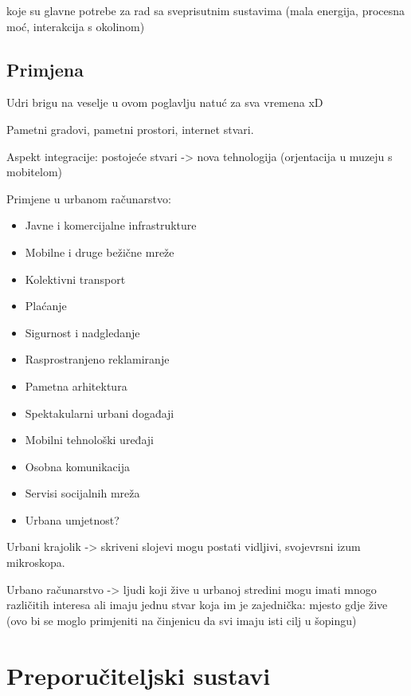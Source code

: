 \documentclass[times, utf8, diplomski, numeric]{fer}
\begin{document}
koje su glavne potrebe za rad sa sveprisutnim sustavima (mala energija,
procesna moć, interakcija s okolinom)

\section{Primjena}

Udri brigu na veselje u ovom poglavlju natuć za sva vremena xD

Pametni gradovi, pametni prostori, internet stvari.

Aspekt integracije: postojeće stvari -> nova tehnologija (orjentacija u muzeju
s mobitelom)

Primjene u urbanom računarstvo:
\begin{itemize}
  \item Javne i komercijalne infrastrukture
  \item Mobilne i druge bežične mreže
  \item Kolektivni transport
  \item Plaćanje
  \item Sigurnost i nadgledanje
  \item Rasprostranjeno reklamiranje
  \item Pametna arhitektura
  \item Spektakularni urbani događaji
  \item Mobilni tehnološki uređaji
  \item Osobna komunikacija
  \item Servisi socijalnih mreža
  \item Urbana umjetnost?
\end{itemize}

Urbani krajolik -> skriveni slojevi mogu postati vidljivi, svojevrsni izum
mikroskopa.

Urbano računarstvo -> ljudi koji žive u urbanoj stredini mogu imati mnogo
različitih interesa ali imaju jednu stvar koja im je zajednička: mjesto gdje
žive (ovo bi se moglo primjeniti na činjenicu da svi imaju isti cilj u šopingu)

\chapter{Preporučiteljski sustavi}
\end{document}
